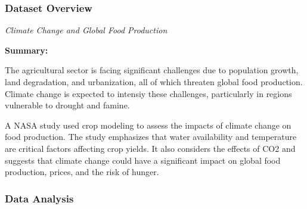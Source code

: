 \documentclass[
  letterpaper,
  DIV=11,
  numbers=noendperiod]{scrreprt}
\begin{document}
\subsubsection{Dataset Overview}\label{dataset-overview}

\emph{Climate Change and Global Food Production}

\textbf{Summary:}

The agricultural sector is facing significant challenges due to
population growth, land degradation, and urbanization, all of which
threaten global food production. Climate change is expected to intensiy
these challenges, particularly in regions vulnerable to drought and
famine.

A NASA study used crop modeling to assess the impacts of climate change
on food production. The study emphasizes that water availability and
temperature are critical factors affecting crop yields. It also
considers the effects of CO2 and suggests that climate change could have
a significant impact on global food production, prices, and the risk of
hunger.

\subsubsection{Data Analysis}\label{data-analysis}
\end{document}
